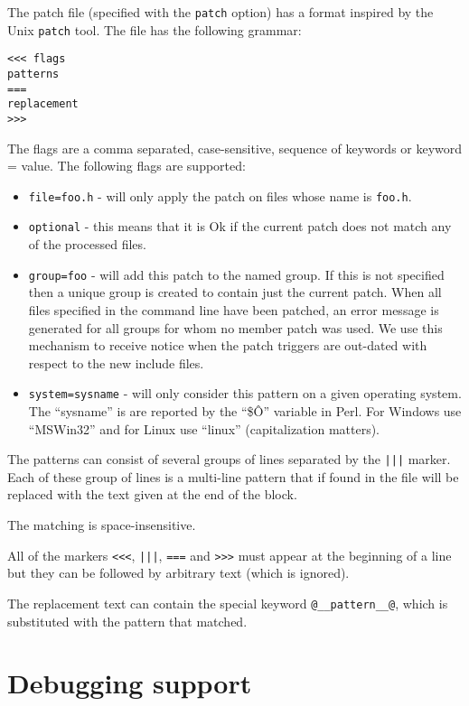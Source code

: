 \documentclass{article}
\def\t#1{{\tt #1}}
\begin{document}
 The patch file (specified with the \t{patch} option) has a format inspired by
the Unix \t{patch} tool. The file has the following grammar:

\begin{verbatim}
<<< flags
patterns
===
replacement
>>>
\end{verbatim}

 The flags are a comma separated, case-sensitive, sequence of keywords or
keyword = value. The following flags are supported:
\begin{itemize}
\item \t{file=foo.h} - will only apply the patch on files whose name is
                       \t{foo.h}. 
\item \t{optional} - this means that it is Ok if the current patch does not
match any of the processed files. 
\item \t{group=foo} - will add this patch to the named group. If this is not
specified then a unique group is created to contain just the current patch.
When all files specified in the command line have been patched, an error
message is generated for all groups for whom no member patch was used. We use
this mechanism to receive notice when the patch triggers are out-dated with
respect to the new include files. 
\item \t{system=sysname} - will only consider this pattern on a given
operating system. The ``sysname'' is are reported by the ``\$\^O'' variable in
Perl. For Windows use ``MSWin32'' and for Linux use ``linux'' (capitalization
matters).
\end{itemize}


 The patterns can consist of several groups of lines separated by the \t{|||}
marker. Each of these group of lines is a multi-line pattern that if found in
the file will be replaced with the text given at the end of the block. 

 The matching is space-insensitive.

 All of the markers \t{<<<}, \t{|||}, \t{===} and \t{>>>} must appear at the
beginning of a line but they can be followed by arbitrary text (which is
ignored).

 The replacement text can contain the special keyword \t{@\_\_pattern\_\_@},
which is substituted with the pattern that matched. 


\section{Debugging support}\label{sec-debugger}
\end{document}
